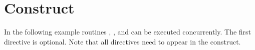\pagebreak
\section{  Construct}
\label{sec:psections}

In the following example routines , , and  can 
be executed concurrently. The first  directive is optional. Note 
that all  directives need to appear in the  
construct.



